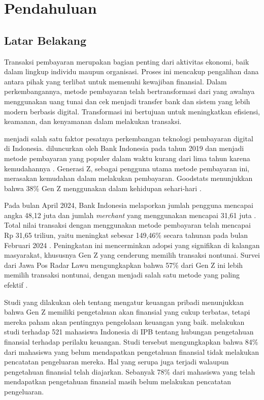 \chapter{Pendahuluan}
\label{chapter:pendahuluan}

\section{Latar Belakang}
\label{sec:latar-belakang}

Transaksi pembayaran merupakan bagian penting dari aktivitas ekonomi, baik dalam lingkup individu maupun organisasi. Proses ini mencakup pengalihan dana antara pihak yang terlibat untuk memenuhi kewajiban finansial. Dalam perkembangannya, metode pembayaran telah bertransformasi dari yang awalnya menggunakan uang tunai dan cek menjadi transfer bank dan sistem yang lebih modern berbasis digital. Transformasi ini bertujuan untuk meningkatkan efisiensi, keamanan, dan kenyamanan dalam melakukan transaksi.

\qrisfull{} menjadi salah satu faktor pesatnya perkembangan teknologi pembayaran digital di Indonesia. \qris{} diluncurkan oleh Bank Indonesia pada tahun 2019 dan menjadi metode pembayaran yang populer dalam waktu kurang dari lima tahun karena kemudahannya \parencite{qris}. Generasi Z, sebagai pengguna utama metode pembayaran ini, merasakan kemudahan dalam melakukan pembayaran. Goodstats menunjukkan bahwa 38\% Gen Z menggunakan \qris{} dalam kehidupan sehari-hari \parencite{qris2023goodstats}.


Pada bulan April 2024, Bank Indonesia melaporkan jumlah pengguna \qris{} mencapai angka 48,12 juta dan jumlah \emph{merchant} yang menggunakan mencapai 31,61 juta \parencite{CNNqris2024}. Total nilai transaksi dengan menggunakan metode pembayaran \qris{} telah mencapai Rp 31,65 triliun, yaitu meningkat sebesar 149,46\% secara tahunan pada bulan Februari 2024 \parencite{Tempo2024BIQRIS}. Peningkatan ini mencerminkan adopsi yang signifikan di kalangan masyarakat, khususnya Gen Z yang cenderung memilih transaksi nontunai. Survei dari Jawa Pos Radar Lawu mengungkapkan bahwa 57\% dari Gen Z ini lebih memilih transaksi nontunai, dengan \qris{} menjadi salah satu metode yang paling efektif \parencite{jawapos2024qris}.

Studi yang dilakukan oleh  tentang mengatur keuangan pribadi menunjukkan bahwa Gen Z memiliki pengetahuan akan finansial yang cukup terbatas, tetapi mereka paham akan pentingnya pengelolaan keuangan yang baik.  melakukan studi terhadap 521 mahasiswa Indonesia di IPB tentang hubungan pengetahuan finansial terhadap perilaku keuangan. Studi tersebut mengungkapkan bahwa 84\% dari mahasiswa yang belum mendapatkan pengetahuan finansial tidak melakukan pencatatan pengeluaran mereka. Hal yang serupa juga terjadi walaupun pengetahuan finansial telah diajarkan. Sebanyak 78\% dari mahasiswa yang telah mendapatkan pengetahuan finansial masih belum melakukan pencatatan pengeluaran. 

